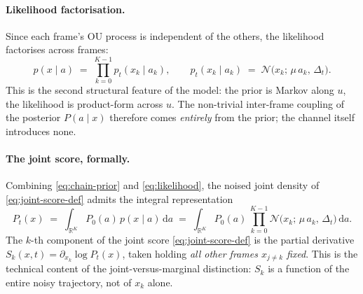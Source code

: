 \documentclass[11pt]{article}
\theoremstyle{definition}
\newcommand{\R}{\mathbb{R}}
\newcommand{\Detl}{\Delta_t}
\begin{document}
\paragraph{Likelihood factorisation.} Since each frame's OU process is
independent of the others, the likelihood factorises across frames:
\begin{equation}\label{eq:likelihood}
    p(x \mid a)
    \;=\; \prod_{k = 0}^{K - 1} p_t(x_k \mid a_k),
    \qquad
    p_t(x_k \mid a_k)
    \;=\; \mathcal N\!\bigl(x_k;\, \mu\, a_k,\, \Detl\bigr).
\end{equation}
This is the second structural feature of the model: the prior is Markov
along \(u\), the likelihood is product-form across \(u\). The non-trivial
inter-frame coupling of the posterior \(P(a \mid x)\) therefore comes
\emph{entirely} from the prior; the channel itself introduces none.

\paragraph{The joint score, formally.} Combining \eqref{eq:chain-prior}
and \eqref{eq:likelihood}, the noised joint density of
\eqref{eq:joint-score-def} admits the integral representation
\begin{equation}\label{eq:Pt-integral}
    P_t(x)
    \;=\;
    \int_{\R^{K}} P_0(a)\, p(x \mid a)\, \mathrm d a
    \;=\;
    \int_{\R^{K}} P_0(a)\,
    \prod_{k = 0}^{K - 1}
    \mathcal N\!\bigl(x_k;\, \mu\, a_k,\, \Detl\bigr)\, \mathrm d a.
\end{equation}
The \(k\)-th component of the joint score
\eqref{eq:joint-score-def} is the partial derivative
\(S_k(x, t) = \partial_{x_k} \log P_t(x)\), taken holding \emph{all
other frames \(x_{j \neq k}\) fixed}. This is the technical content of
the joint-versus-marginal distinction: \(S_k\) is a function of the
entire noisy trajectory, not of \(x_k\) alone.
\end{document}
